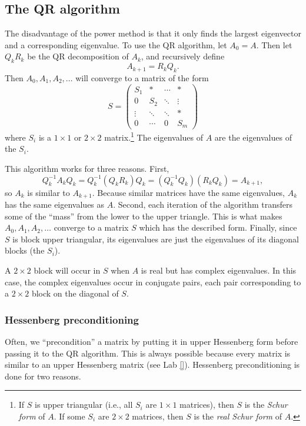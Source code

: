 \subsection*{The QR algorithm}
The disadvantage of the power method is that it only finds the largest eigenvector and a corresponding eigenvalue. 
To use the QR algorithm, let $A_0=A$. Then let $Q_kR_k$ be the QR decomposition of $A_k$, and recursively define 
\[
A_{k+1}=R_kQ_k.
\] 
Then $A_0, A_1, A_2, \ldots $ will converge to a matrix of the form
\begin{equation*}
\label{eq:Schur form}
S =
     \begin{pmatrix}
          S_1 &* & \cdots & * \\
           0     &S_2  &  \ddots & \vdots \\
           \vdots  & \ddots & \ddots & *  \\
           0 & \cdots & 0 & S_m
    \end{pmatrix}
\end{equation*}
where $S_i$ is a $1\times1$ or $2\times2$ matrix.\footnote{If $S$ is upper triangular (i.e., all $S_i$ are $1\times1$ matrices), then $S$ is the \emph{Schur form} of $A$. 
If some $S_i$ are $2\times2$ matrices, then $S$ is the \emph{real Schur form} of $A$.} 
The eigenvalues of $A$ are the eigenvalues of the $S_i$.

This algorithm works for three reasons. First, 
\[
Q_k^{-1}A_kQ_k = Q_k^{-1}(Q_kR_k)Q_k = (Q_k^{-1}Q_k)(R_kQ_k) = A_{k+1},
\]
so $A_k$ is similar to $A_{k+1}$. 
Because similar matrices have the same eigenvalues, $A_k$ has the same eigenvalues as $A$. 
Second, each iteration of the algorithm transfers some of the ``mass'' from the lower to the upper triangle. 
This is what makes $A_0, A_1, A_2, \ldots$ converge to a matrix $S$ which has the described form. 
Finally, since $S$ is block upper triangular, its eigenvalues are just the eigenvalues of its diagonal blocks (the $S_i$).

A $2 \times 2$ block will occur in $S$ when $A$ is real but has complex eigenvalues. 
In this case, the complex eigenvalues occur in conjugate pairs, each pair corresponding to a $2 \times 2$ block on the diagonal of $S$.


\subsubsection*{Hessenberg preconditioning}
Often, we ``precondition'' a matrix by putting it in upper Hessenberg form before passing it to the QR algorithm. 
This is always possible because every matrix is similar to an upper Hessenberg matrix (see Lab \ref{}). 
Hessenberg preconditioning is done for two reasons.


